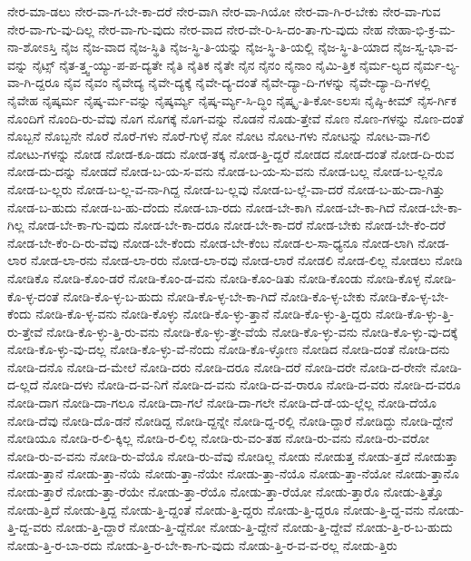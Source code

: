 {ನೇರ-ಮಾ-ಡಲು
ನೇರ-ವಾ-ಗ-ಬೇ-ಕಾ-ದರೆ
ನೇರ-ವಾಗಿ
ನೇರ-ವಾ-ಗಿಯೋ
ನೇರ-ವಾ-ಗಿ-ರ-ಬೇಕು
ನೇರ-ವಾ-ಗುವ
ನೇರ-ವಾ-ಗು-ವು-ದಿಲ್ಲ
ನೇರ-ವಾ-ಗು-ವುದು
ನೇರ-ವಾದ
ನೇರ-ವೇ-ರಿ-ಸಿ-ದಂ-ತಾ-ಗು-ವುದು
ನೇಹ
ನೇಹಾ-ಭಿ-ಕ್ರ-ಮ-ನಾ-ಶೋಽಸ್ತಿ
ನೈಜ
ನೈಜ-ವಾದ
ನೈಜ-ಸ್ಥಿತಿ
ನೈಜ-ಸ್ಥಿ-ತಿ-ಯನ್ನು
ನೈಜ-ಸ್ಥಿ-ತಿ-ಯಲ್ಲಿ
ನೈಜ-ಸ್ಥಿ-ತಿ-ಯಾದ
ನೈಜ-ಸ್ವ-ಭಾ-ವ-ವನ್ನು
ನೈಟ್ಸ್
ನೈತ-ತ್ತ್ವ-ಯ್ಯು-ಪ-ಪ-ದ್ಯತೇ
ನೈತಿ
ನೈತಿಕ
ನೈತೇ
ನೈನ
ನೈನಂ
ನೈನಾಂ
ನೈಮಿ-ತ್ತಿಕ
ನೈರ್ಮ-ಲ್ಯದ
ನೈರ್ಮ-ಲ್ಯ-ವಾ-ಗಿ-ದ್ದರೂ
ನೈವ
ನೈವಂ
ನೈವೇದ್ಯ
ನೈವೇ-ದ್ಯಕ್ಕೆ
ನೈವೇ-ದ್ಯ-ದಂತೆ
ನೈವೇ-ದ್ಯಾ-ದಿ-ಗಳನ್ನು
ನೈವೇ-ದ್ಯಾ-ದಿ-ಗಳಲ್ಲಿ
ನೈವೇಹ
ನೈಷ್ಕರ್ಮ
ನೈಷ್ಕ-ರ್ಮ-ವನ್ನು
ನೈಷ್ಕರ್ಮ್ಯ
ನೈಷ್ಕ-ರ್ಮ್ಯ-ಸಿ-ದ್ಧಿಂ
ನೈಷ್ಕೃ-ತಿ-ಕೋ-ಽಲಸಃ
ನೈಷ್ಠಿ-ಕೀಮ್
ನೈಸ-ರ್ಗಿಕ
ನೊಂದಿಗೆ
ನೊಂದಿ-ರು-ವೆವು
ನೊಗ
ನೊಗಕ್ಕೆ
ನೊಗ-ವನ್ನು
ನೊಡನೆ
ನೊಡು-ತ್ತೇವೆ
ನೊಣ
ನೊಣ-ಗಳನ್ನು
ನೊಣ-ದಂತೆ
ನೊಬ್ಬನೆ
ನೊಬ್ಬನೇ
ನೊರೆ
ನೊರೆ-ಗಳು
ನೊರೆ-ಗುಳ್ಳೆ
ನೋ
ನೋಟ
ನೋಟ-ಗಳು
ನೋಟನ್ನು
ನೋಟ-ವಾ-ಗಲಿ
ನೋಟು-ಗಳನ್ನು
ನೋಡ
ನೋಡ-ಕೂ-ಡದು
ನೋಡ-ತಕ್ಕ
ನೋಡ-ತ್ತಿ-ದ್ದರೆ
ನೋಡದ
ನೋಡ-ದಂತೆ
ನೋಡ-ದಿ-ರುವ
ನೋಡ-ದು-ದನ್ನು
ನೋಡದೆ
ನೋಡ-ಬ-ಯ-ಸ-ವನು
ನೋಡ-ಬ-ಯ-ಸು-ವನು
ನೋಡ-ಬಲ್ಲ
ನೋಡ-ಬ-ಲ್ಲನೊ
ನೋಡ-ಬ-ಲ್ಲರು
ನೋಡ-ಬ-ಲ್ಲ-ವ-ನಾ-ಗಿದ್ದ
ನೋಡ-ಬ-ಲ್ಲವು
ನೋಡ-ಬ-ಲ್ಲೆ-ವಾ-ದರೆ
ನೋಡ-ಬ-ಹು-ದಾ-ಗಿತ್ತು
ನೋಡ-ಬ-ಹುದು
ನೋಡ-ಬ-ಹು-ದೆಂದು
ನೋಡ-ಬಾ-ರದು
ನೋಡ-ಬೇ-ಕಾಗಿ
ನೋಡ-ಬೇ-ಕಾ-ಗಿದೆ
ನೋಡ-ಬೇ-ಕಾ-ಗಿಲ್ಲ
ನೋಡ-ಬೇ-ಕಾ-ಗು-ವುದು
ನೋಡ-ಬೇ-ಕಾ-ದರೂ
ನೋಡ-ಬೇ-ಕಾ-ದರೆ
ನೋಡ-ಬೇಕು
ನೋಡ-ಬೇ-ಕೆಂ-ದರೆ
ನೋಡ-ಬೇ-ಕೆಂ-ದಿ-ರು-ವೆವು
ನೋಡ-ಬೇ-ಕೆಂದು
ನೋಡ-ಬೇ-ಕೆಂಬ
ನೋಡ-ಲ-ಸಾ-ಧ್ಯನೂ
ನೋಡ-ಲಾಗಿ
ನೋಡ-ಲಾರ
ನೋಡ-ಲಾ-ರನು
ನೋಡ-ಲಾ-ರರು
ನೋಡ-ಲಾ-ರವು
ನೋಡ-ಲಾರೆ
ನೋಡಲಿ
ನೋಡ-ಲಿಲ್ಲ
ನೋಡಲು
ನೋಡಿ
ನೋಡಿಕೊ
ನೋಡಿ-ಕೊಂ-ಡರೆ
ನೋಡಿ-ಕೊಂ-ಡ-ವನು
ನೋಡಿ-ಕೊಂ-ಡಿತು
ನೋಡಿ-ಕೊಂಡು
ನೋಡಿ-ಕೊಳ್ಳ
ನೋಡಿ-ಕೊ-ಳ್ಳ-ದಂತೆ
ನೋಡಿ-ಕೊ-ಳ್ಳ-ಬ-ಹುದು
ನೋಡಿ-ಕೊ-ಳ್ಳ-ಬೇ-ಕಾ-ಗಿದೆ
ನೋಡಿ-ಕೊ-ಳ್ಳ-ಬೇಕು
ನೋಡಿ-ಕೊ-ಳ್ಳ-ಬೇ-ಕೆಂದು
ನೋಡಿ-ಕೊ-ಳ್ಳ-ವನು
ನೋಡಿ-ಕೊಳ್ಳು
ನೋಡಿ-ಕೊ-ಳ್ಳು-ತ್ತಾನೆ
ನೋಡಿ-ಕೊ-ಳ್ಳು-ತ್ತಿ-ದ್ದರು
ನೋಡಿ-ಕೊ-ಳ್ಳು-ತ್ತಿ-ರು-ತ್ತೇವೆ
ನೋಡಿ-ಕೊ-ಳ್ಳು-ತ್ತಿ-ರು-ವನು
ನೋಡಿ-ಕೊ-ಳ್ಳು-ತ್ತೇ-ವೆಯೆ
ನೋಡಿ-ಕೊ-ಳ್ಳು-ವನು
ನೋಡಿ-ಕೊ-ಳ್ಳು-ವು-ದಕ್ಕೆ
ನೋಡಿ-ಕೊ-ಳ್ಳು-ವು-ದಲ್ಲ
ನೋಡಿ-ಕೊ-ಳ್ಳು-ವೆ-ನೆಂದು
ನೋಡಿ-ಕೊ-ಳ್ಳೋಣ
ನೋಡಿದ
ನೋಡಿ-ದಂತೆ
ನೋಡಿ-ದನು
ನೋಡಿ-ದನೊ
ನೋಡಿ-ದ-ಮೇಲೆ
ನೋಡಿ-ದರು
ನೋಡಿ-ದರೂ
ನೋಡಿ-ದರೆ
ನೋಡಿ-ದರೇ
ನೋಡಿ-ದ-ರೇನೇ
ನೋಡಿ-ದ-ಲ್ಲದೆ
ನೋಡಿ-ದಳು
ನೋಡಿ-ದ-ವ-ನಿಗೆ
ನೋಡಿ-ದ-ವನು
ನೋಡಿ-ದ-ವ-ರಾರೂ
ನೋಡಿ-ದ-ವರು
ನೋಡಿ-ದ-ವರೂ
ನೋಡಿ-ದಾಗ
ನೋಡಿ-ದಾ-ಗಲೂ
ನೋಡಿ-ದಾ-ಗಲೆ
ನೋಡಿ-ದಾ-ಗಲೇ
ನೋಡಿ-ದೆ-ಡೆ-ಯ-ಲ್ಲೆಲ್ಲ
ನೋಡಿ-ದೆಯೊ
ನೋಡಿ-ದೆವು
ನೋಡಿ-ದೊ-ಡನೆ
ನೋಡಿದ್ದ
ನೋಡಿ-ದ್ದನ್ನೇ
ನೋಡಿ-ದ್ದ-ರಲ್ಲಿ
ನೋಡಿ-ದ್ದಾರೆ
ನೋಡಿದ್ದು
ನೋಡಿ-ದ್ದೇನೆ
ನೋಡಿಯೂ
ನೋಡಿ-ರ-ಲಿ-ಕ್ಕಿಲ್ಲ
ನೋಡಿ-ರ-ಲಿಲ್ಲ
ನೋಡಿ-ರು-ವಂ-ತಹ
ನೋಡಿ-ರು-ವನು
ನೋಡಿ-ರು-ವರೋ
ನೋಡಿ-ರು-ವ-ವನು
ನೋಡಿ-ರು-ವೆಯೊ
ನೋಡಿ-ರು-ವೆವು
ನೋಡಿಲ್ಲ
ನೋಡು
ನೋಡುತ್ತ
ನೋಡು-ತ್ತದೆ
ನೋಡುತ್ತಾ
ನೋಡು-ತ್ತಾನೆ
ನೋಡು-ತ್ತಾ-ನೆಯೆ
ನೋಡು-ತ್ತಾ-ನೆಯೇ
ನೋಡು-ತ್ತಾ-ನೆಯೊ
ನೋಡು-ತ್ತಾ-ನೆಯೋ
ನೋಡು-ತ್ತಾನೊ
ನೋಡು-ತ್ತಾರೆ
ನೋಡು-ತ್ತಾ-ರೆಯೇ
ನೋಡು-ತ್ತಾ-ರೆಯೊ
ನೋಡು-ತ್ತಾ-ರೆಯೋ
ನೋಡು-ತ್ತಾರೊ
ನೋಡು-ತ್ತಿತ್ತೊ
ನೋಡು-ತ್ತಿದೆ
ನೋಡು-ತ್ತಿದ್ದ
ನೋಡು-ತ್ತಿ-ದ್ದಂತೆ
ನೋಡು-ತ್ತಿ-ದ್ದರು
ನೋಡು-ತ್ತಿ-ದ್ದರೂ
ನೋಡು-ತ್ತಿ-ದ್ದ-ವನು
ನೋಡು-ತ್ತಿ-ದ್ದ-ವರು
ನೋಡು-ತ್ತಿ-ದ್ದಾರೆ
ನೋಡು-ತ್ತಿ-ದ್ದೆನೋ
ನೋಡು-ತ್ತಿ-ದ್ದೇನೆ
ನೋಡು-ತ್ತಿ-ದ್ದೇವೆ
ನೋಡು-ತ್ತಿ-ರ-ಬ-ಹುದು
ನೋಡು-ತ್ತಿ-ರ-ಬಾ-ರದು
ನೋಡು-ತ್ತಿ-ರ-ಬೇ-ಕಾ-ಗು-ವುದು
ನೋಡು-ತ್ತಿ-ರ-ವ-ವ-ರಲ್ಲ
ನೋಡು-ತ್ತಿರು
}
